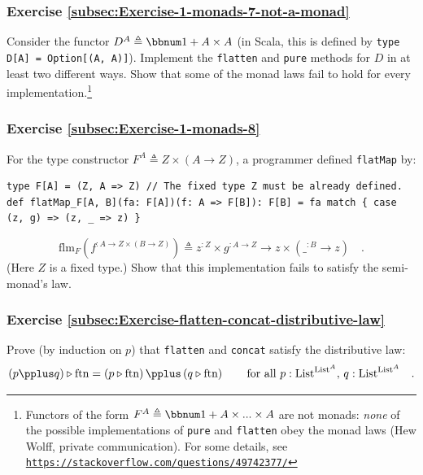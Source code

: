 \subsubsection{Exercise \label{subsec:Exercise-1-monads-7-not-a-monad}\ref{subsec:Exercise-1-monads-7-not-a-monad}}

Consider the functor $D^{A}\triangleq\bbnum 1+A\times A$ (in Scala,
this is defined by \lstinline!type D[A] = Option[(A, A)]!). Implement
the \lstinline!flatten! and \lstinline!pure! methods for $D$ in
at least two different ways. Show that some of the monad laws fail
to hold for every implementation.\footnote{Functors of the form $F^{A}\triangleq\bbnum 1+A\times...\times A$
are not monads: \emph{none} of the possible implementations of \lstinline!pure!
and \lstinline!flatten! obey the monad laws (Hew Wolff, private communication).
For some details, see \texttt{\href{https://stackoverflow.com/questions/49742377/}{https://stackoverflow.com/questions/49742377/}}}

\subsubsection{Exercise \label{subsec:Exercise-1-monads-8}\ref{subsec:Exercise-1-monads-8}}

For the type constructor $F^{A}\triangleq Z\times\left(A\rightarrow Z\right)$,
a programmer defined \lstinline!flatMap! by:
\begin{lstlisting}
type F[A] = (Z, A => Z) // The fixed type Z must be already defined.
def flatMap_F[A, B](fa: F[A])(f: A => F[B]): F[B] = fa match { case (z, g) => (z, _ => z) }
\end{lstlisting}
\[
\text{flm}_{F}(f^{:A\rightarrow Z\times\left(B\rightarrow Z\right)})\triangleq z^{:Z}\times g^{:A\rightarrow Z}\rightarrow z\times(\_^{:B}\rightarrow z)\quad.
\]
(Here $Z$ is a fixed type.) Show that this implementation fails to
satisfy the semi-monad\textsf{'}s law. 

\subsubsection{Exercise \label{subsec:Exercise-flatten-concat-distributive-law}\ref{subsec:Exercise-flatten-concat-distributive-law}}

Prove (by induction on $p$) that \lstinline!flatten! and \lstinline!concat!
satisfy the distributive law:
\[
\left(p\pplus q\right)\triangleright\text{ftn}=\left(p\triangleright\text{ftn}\right)\pplus\left(q\triangleright\text{ftn}\right)\quad\quad\text{for all }p:\text{List}^{\text{List}^{A}},\,q:\text{List}^{\text{List}^{A}}\quad.
\]


